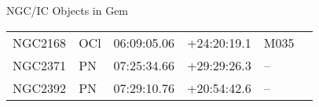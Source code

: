 \begin{block}{NGC/IC Objects in Gem}
  \centering
  \begin{tabularx}{\textwidth}{llrrll} \toprule 
    NGC2168 & OCl & 06:09:05.06 & +24:20:19.1  & M035 \\ 
    NGC2371 & PN & 07:25:34.66 & +29:29:26.3  & -- \\ 
    NGC2392 & PN & 07:29:10.76 & +20:54:42.6  & -- \\ 
  \end{tabularx}
\end{block}